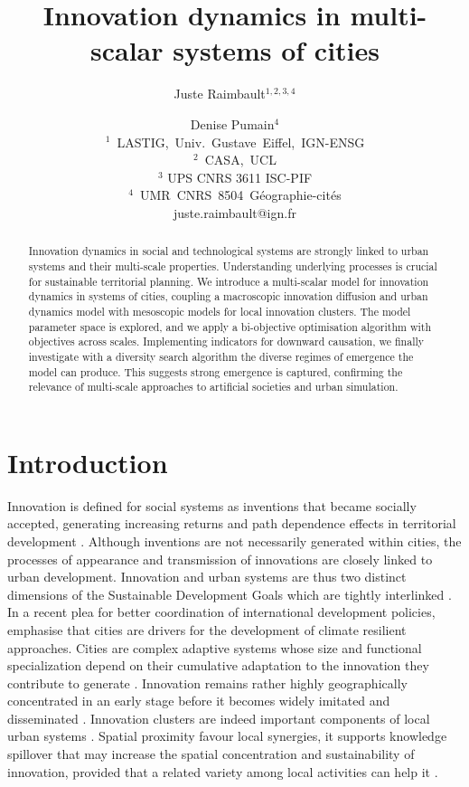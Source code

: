 \documentclass[letterpaper]{article}
\title{Innovation dynamics in multi-scalar systems of cities}
\author{Juste Raimbault$^{1,2,3,4}$ \and Denise Pumain$^{4}$\\
\mbox{$^1$ LASTIG, Univ. Gustave Eiffel, IGN-ENSG}\\
\mbox{$^2$ CASA, UCL}\\
\mbox{$^3$} UPS CNRS 3611 ISC-PIF\\
\mbox{$^4$ UMR CNRS 8504 G{\'e}ographie-cit{\'e}}s\\
juste.raimbault@ign.fr}
\begin{document}
\maketitle

\begin{abstract}
Innovation dynamics in social and technological systems are strongly linked to urban systems and their multi-scale properties. Understanding underlying processes is crucial for sustainable territorial planning. We introduce a multi-scalar model for innovation dynamics in systems of cities, coupling a macroscopic innovation diffusion and urban dynamics model with mesoscopic models for local innovation clusters. The model parameter space is explored, and we apply a bi-objective optimisation algorithm with objectives across scales. Implementing indicators for downward causation, we finally investigate with a diversity search algorithm the diverse regimes of emergence the model can produce. This suggests strong emergence is captured, confirming the relevance of multi-scale approaches to artificial societies and urban simulation.
\end{abstract}



\section{Introduction}


Innovation is defined for social systems as inventions that became socially accepted, generating increasing returns and path dependence effects in territorial development \citep{arthur1994increasing}. Although inventions are not necessarily generated within cities, the processes of appearance and transmission of innovations are closely linked to urban development. Innovation and urban systems are thus two distinct dimensions of the Sustainable Development Goals which are tightly interlinked \citep{hegre2020synergies}. In a recent plea for better coordination of international development policies, \cite{keith2022new} emphasise that cities are drivers for the development of climate resilient approaches. Cities are complex adaptive systems whose size and functional specialization depend on their cumulative adaptation to the innovation they contribute to generate \citep{pumain2020theories}. Innovation remains rather highly geographically concentrated in an early stage before it becomes widely imitated and disseminated \citep{audretsch1996innovative}. Innovation clusters are indeed important components of local urban systems \citep{moreno2006innovation}. Spatial proximity favour local synergies, it supports knowledge spillover that may increase the spatial concentration and sustainability of innovation, provided that a related variety among local activities can help it \citep{boschma2009related,frenken2007related}.
\end{document}
